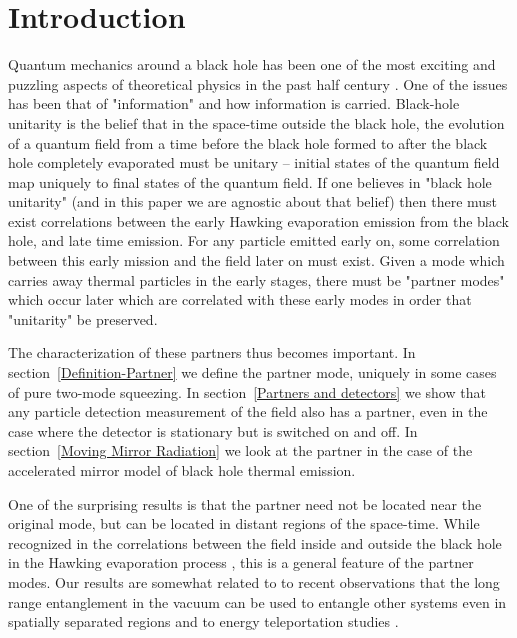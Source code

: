 \documentclass[aps,prd,showpacs,amssymb,nofootinbib,twocolumn]{revtex4}
\begin{document}
\section{Introduction}

Quantum mechanics around a black hole has been one of the most exciting and
puzzling aspects of theoretical physics in the past half century 
\cite{hawking}. 
%
One of the issues has been that of "information" and how information is carried.
%
Black-hole unitarity \cite{unitarity} is the belief that in the space-time 
outside the black hole, the evolution of a quantum field from a time before 
the black hole formed to after the black hole completely evaporated must be 
unitary -- initial states of the quantum field map uniquely to final states 
of the quantum field. 
%
If one believes in "black hole unitarity" (and in this paper we are agnostic 
about that belief) then there must exist correlations between the early 
Hawking evaporation emission from the black hole, and late time emission. 
%
For any particle emitted early on, some correlation between this early 
mission and the field later on must exist. 
%
Given a mode which carries away thermal particles in the early stages, 
there must be "partner modes" which occur later which are correlated with 
these early modes in order  that "unitarity" be preserved. 

The characterization of these partners thus becomes important. 
%
In section~\ref{Definition-Partner} we define the partner mode, 
uniquely in some cases of pure two-mode squeezing. 
%
In section~\ref{Partners and detectors} we show that any particle detection 
measurement of the field also has a partner, even in the case where the 
detector is stationary but is switched on and off. 
%
In section~\ref{Moving Mirror Radiation} we look at the partner in the case 
of the accelerated mirror model of black hole thermal emission. 

One of the surprising results is that the partner need not be located near the
original mode, but can be located in distant regions of the space-time. 
%
While recognized in the correlations between the field inside and outside the 
black hole in the Hawking evaporation process \cite{SU}, this is a general 
feature of the partner modes.
%
Our results are somewhat related to to recent observations that the long range
entanglement in the vacuum can be used to entangle other systems even in
spatially separated regions \cite{reznik} and to energy teleportation studies 
\cite{hotta}.
\end{document}

